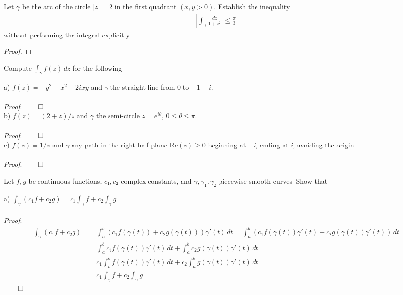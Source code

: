\documentclass[12pt]{article}
\newenvironment{exercise}[2][Exercise]{\begin{trivlist}
\item[\hskip \labelsep {\bfseries #1}\hskip \labelsep {\bfseries #2.}]}{\end{trivlist}}
\begin{document}
\begin{exercise}{3} Let $\gamma$ be the arc of the circle $|z| = 2$ in the first quadrant $(x,y>0)$. Establish the inequality
\begin{align*}
\left| \int_{\gamma} \frac{dz}{1 + z^2} \right| \leq \frac{\pi}{3}
\end{align*}
without performing the integral explicitly. 
\end{exercise}
 
\begin{proof}

\end{proof}

\begin{exercise}{4} Compute $\int_{\gamma} f(z) \, dz$ for the following 
\end{exercise}
 
\noindent a) $f(z) = -y^2 + x^2 - 2ixy$ and $\gamma$ the straight line from $0$ to $-1-i$. \\ \\ 
{\em Proof}.
$\hfill \qed$ \\

\noindent b) $f(z) = (2+z)/z$ and $\gamma$ the semi-circle $z = e^{i\theta}$, $0 \leq \theta \leq \pi$. \\ \\
{\em Proof}.
$\hfill \qed$ \\

\noindent c) $f(z) = 1/z$ and $\gamma$ any path in the right half plane $\text{Re}(z) \geq 0$ beginning at $-i$, ending at $i$, avoiding the origin. \\ \\ 
{\em Proof}.
$\hfill \qed$ 

\begin{exercise}{5} Let $f,g$ be continuous functions, $c_1,c_2$ complex constants, and $\gamma,\gamma_1,\gamma_2$ piecewise smooth curves. Show that
\end{exercise}
 
\noindent a) $\int_{\gamma} (c_1f+c_2g) = c_1\int_{\gamma} f + c_2\int_{\gamma} g$ \\ \\
{\em Proof}.
\begin{align*}
\int_{\gamma} (c_1f+c_2g) &= \int_a^b (c_1f(\gamma(t)) + c_2g(\gamma(t))) \gamma'(t) \, dt = \int_a^b (c_1f(\gamma(t)) \gamma'(t) + c_2g(\gamma(t)) \gamma'(t) ) \, dt \\ 
&= \int_a^b c_1f(\gamma(t)) \gamma'(t) \, dt + \int_a^b c_2g(\gamma(t)) \gamma'(t) \, dt \\ &= c_1 \int_a^b f(\gamma(t)) \gamma'(t) \, dt + c_2 \int_a^b g(\gamma(t)) \gamma'(t) \, dt \\
&= c_1\int_{\gamma} f + c_2\int_{\gamma} g
\end{align*}
$\hfill \qed$ \\
\end{document}
